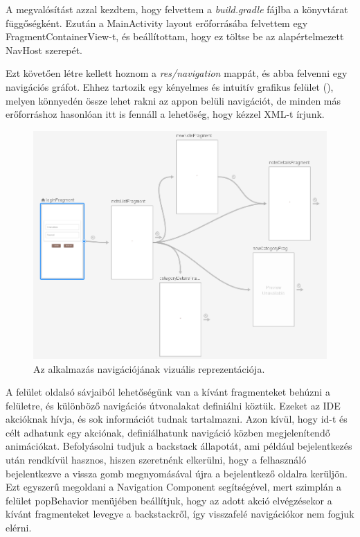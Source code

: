 A megvalósítást azzal kezdtem, hogy felvettem a \emph{build.gradle} fájlba a könyvtárat függőségként. Ezután a MainActivity layout erőforrásába felvettem egy FragmentContainerView-t, és beállítottam, hogy ez töltse be az alapértelmezett NavHost szerepét. 

Ezt követően létre kellett hoznom a \emph{res/navigation} mappát, és abba felvenni egy navigációs gráfot. Ehhez tartozik egy kényelmes és intuitív grafikus felület (), melyen könnyedén össze lehet rakni az appon belüli navigációt, de minden más erőforráshoz hasonlóan itt is fennáll a lehetőség, hogy kézzel XML-t írjunk. 

\begin{figure}[!ht]
	\centering
	\includegraphics[width=150mm, keepaspectratio]{figures/nav_graph.png}
	\caption{Az alkalmazás navigációjának vizuális reprezentációja.}
	\label{fig:NavGraph}
\end{figure}

A felület oldalsó sávjaiból lehetőségünk van a kívánt fragmenteket behúzni a felületre, és különböző navigációs útvonalakat definiálni köztük. Ezeket az IDE akcióknak hívja, és sok információt tudnak tartalmazni. Azon kívül, hogy id-t és célt adhatunk egy akciónak, definiálhatunk navigáció közben megjelenítendő animációkat. Befolyásolni tudjuk a backstack állapotát, ami például bejelentkezés után rendkívül hasznos, hiszen szeretnénk elkerülni, hogy a felhasználó bejelentkezve a vissza gomb megnyomásával újra a bejelentkező oldalra kerüljön. Ezt egyszerű megoldani a Navigation Component segítségével, mert szimplán a felület popBehavior menüjében beállítjuk, hogy az adott akció elvégzésekor a kívánt fragmenteket levegye a backstackről, így visszafelé navigációkor nem fogjuk elérni. 

